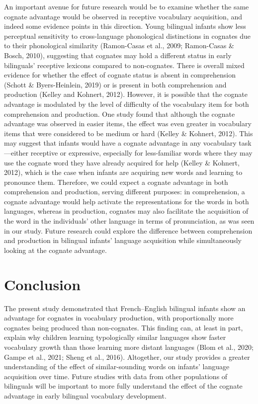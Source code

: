 \documentclass[
  english,
  ,man,floatsintext]{apa6}
\begin{document}
An important avenue for future research would be to examine whether the same cognate advantage would be observed in receptive vocabulary acquisition, and indeed some evidence points in this direction. Young bilingual infants show less perceptual sensitivity to cross-language phonological distinctions in cognates due to their phonological similarity (Ramon-Casas et al., 2009; Ramon-Casas \& Bosch, 2010), suggesting that cognates may hold a different status in early bilinguals' receptive lexicons compared to non-cognates. There is overall mixed evidence for whether the effect of cognate status is absent in comprehension (Schott \& Byers-Heinlein, 2019) or is present in both comprehension and production (Kelley and Kohnert, 2012). However, it is possible that the cognate advantage is modulated by the level of difficulty of the vocabulary item for both comprehension and production. One study found that although the cognate advantage was observed in easier items, the effect was even greater in vocabulary items that were considered to be medium or hard (Kelley \& Kohnert, 2012). This may suggest that infants would have a cognate advantage in any vocabulary task---either receptive or expressive, especially for less-familiar words where they may use the cognate word they have already acquired for help (Kelley \& Kohnert, 2012), which is the case when infants are acquiring new words and learning to pronounce them. Therefore, we could expect a cognate advantage in both comprehension and production, serving different purposes: in comprehension, a cognate advantage would help activate the representations for the words in both languages, whereas in production, cognates may also facilitate the acquisition of the word in the individuals' other language in terms of pronunciation, as was seen in our study. Future research could explore the difference between comprehension and production in bilingual infants' language acquisition while simultaneously looking at the cognate advantage.

\hypertarget{conclusion}{%
\section{Conclusion}\label{conclusion}}

The present study demonstrated that French--English bilingual infants show an advantage for cognates in vocabulary production, with proportionally more cognates being produced than non-cognates. This finding can, at least in part, explain why children learning typologically similar languages show faster vocabulary growth than those learning more distant languages (Blom et al., 2020; Gampe et al., 2021; Sheng et al., 2016). Altogether, our study provides a greater understanding of the effect of similar-sounding words on infants' language acquisition over time. Future studies with data from other populations of bilinguals will be important to more fully understand the effect of the cognate advantage in early bilingual vocabulary development.
\end{document}
